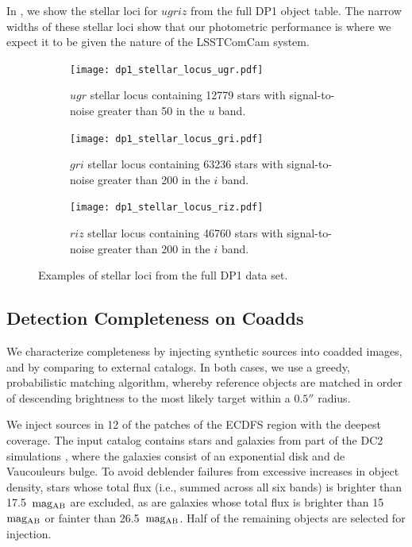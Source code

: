In , we show the stellar loci for $ugriz$ from the full DP1 object table.
The narrow widths of these stellar loci show that our photometric performance is where we expect it to be given the nature of the LSSTComCam system.

\begin{figure}[hbt!]
  \centering
  \begin{subfigure}[t]{0.31\textwidth}
  \texttt{[image: dp1\_stellar\_locus\_ugr.pdf]}
  \caption{$ugr$ stellar locus containing 12779 stars with signal-to-noise greater than 50 in the $u$ band.}
  \end{subfigure}\hfill
  \begin{subfigure}[t]{0.31\textwidth}
  \texttt{[image: dp1\_stellar\_locus\_gri.pdf]}
  \caption{$gri$ stellar locus containing 63236 stars with signal-to-noise greater than 200 in the $i$ band.}
  \end{subfigure}\hfill
    \begin{subfigure}[t]{0.31\textwidth}
  \texttt{[image: dp1\_stellar\_locus\_riz.pdf]}
  \caption{$riz$ stellar locus containing 46760 stars with signal-to-noise greater than 200 in the $i$ band.}
  \end{subfigure}\hfill
\caption{Examples of stellar loci from the full DP1 data set.}
  \label{fig:stellarloci}
\end{figure}

\subsection{Detection Completeness on Coadds}
\label{ssec:detection_completeness}
We characterize completeness by injecting synthetic sources into coadded images, and by comparing to external catalogs.
In both cases, we use a greedy, probabilistic matching \gls{algorithm}, whereby reference objects are matched in order of descending brightness to the most likely target within a $0.5''$ radius.

We inject sources in 12 of the patches of the \gls{ECDFS} region with the deepest coverage.
The input catalog contains stars and galaxies from part of the \gls{DC2} simulations \citep{2021ApJS..253...31L}, where the galaxies consist of an exponential disk and de Vaucouleurs \citep{1948AnAp...11..247D,1953MNRAS.113..134D} bulge.
To avoid deblender failures from excessive increases in object density, stars whose total \gls{flux} (i.e., summed across all six bands) is brighter than 17.5~${\rm mag_{\rm AB}}$ are excluded, as are galaxies whose total \gls{flux} is brighter than 15~${\rm mag_{AB}}$ or fainter than 26.5~${\rm mag_{AB}}$. Half of the remaining objects are selected for injection.

